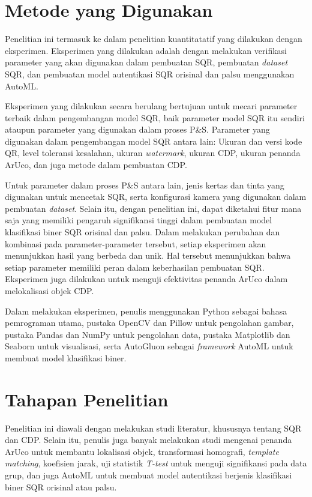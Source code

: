\section{Metode yang Digunakan}
Penelitian ini termasuk ke dalam penelitian kuantitatatif yang dilakukan dengan eksperimen. Eksperimen yang dilakukan adalah dengan melakukan verifikasi
parameter yang akan digunakan dalam pembuatan SQR, pembuatan \emph{dataset} SQR, dan pembuatan model autentikasi SQR orisinal dan palsu menggunakan AutoML.

Eksperimen yang dilakukan secara berulang bertujuan untuk mecari parameter terbaik dalam pengembangan model SQR, baik parameter model SQR itu sendiri ataupun
parameter yang digunakan dalam proses P\&S. Parameter yang digunakan dalam pengembangan model SQR antara lain: Ukuran dan versi kode QR, level toleransi
kesalahan, ukuran \emph{watermark}, ukuran CDP, ukuran penanda ArUco, dan juga metode dalam pembuatan CDP.

Untuk parameter dalam proses P\&S antara lain, jenis kertas dan tinta yang digunakan untuk mencetak SQR, serta konfigurasi kamera yang digunakan dalam
pembuatan \emph{dataset}. Selain itu, dengan penelitian ini, dapat diketahui fitur mana saja yang memiliki pengaruh signifikansi tinggi dalam pembuatan model
klasifikasi biner SQR orisinal dan palsu. Dalam melakukan perubahan dan kombinasi pada parameter-parameter tersebut, setiap eksperimen akan menunjukkan hasil
yang berbeda dan unik. Hal tersebut menunjukkan bahwa setiap parameter memiliki peran dalam keberhasilan pembuatan SQR. Eksperimen juga dilakukan untuk menguji
efektivitas penanda ArUco dalam melokalisasi objek CDP.

Dalam melakukan eksperimen, penulis menggunakan Python sebagai bahasa pemrograman utama, pustaka OpenCV dan Pillow untuk pengolahan gambar, pustaka Pandas dan
NumPy untuk pengolahan data, pustaka Matplotlib dan Seaborn untuk visualisasi, serta AutoGluon sebagai \emph{framework} AutoML untuk membuat model klasifikasi
biner.

\section{Tahapan Penelitian}
Penelitian ini diawali dengan melakukan studi literatur, khususnya tentang SQR dan CDP. Selain itu, penulis juga banyak melakukan studi mengenai penanda ArUco
untuk membantu lokalisasi objek, transformasi homografi, \emph{template matching}, koefisien jarak, uji statistik \emph{T-test} untuk menguji signifikansi pada
data grup, dan juga AutoML untuk membuat model autentikasi berjenis klasifikasi biner SQR orisinal atau palsu.

